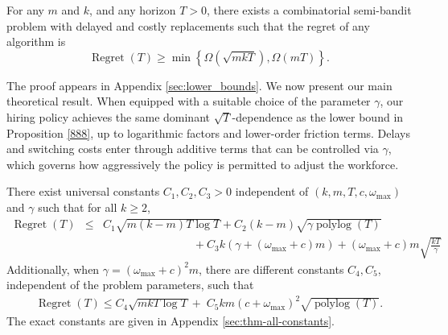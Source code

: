 \documentclass[opre,blindrev]{informs3}
\newcommand{\polylog}{\operatorname{polylog}}
\newcommand{\Regret}{\operatorname{Regret}}
\begin{document}
\begin{proposition} 
\label{888}
For any \(m\) and \(k\), and any horizon \(T > 0\), there exists a combinatorial semi-bandit problem with delayed and costly replacements such that the regret of any algorithm is
\begin{equation*}
    \Regret(T) \geq \min \left\{\Omega\left(\sqrt{mkT}\right), \Omega\left(mT\right) \right\}.
\end{equation*}
\end{proposition}

The proof appears in Appendix \ref{sec:lower_bounds}. We now present our main theoretical result. When equipped with a suitable choice of the parameter \(\gamma\), our hiring policy achieves the same dominant \(\sqrt{T}\)-dependence as the lower bound in Proposition \ref{888}, up to logarithmic factors and lower-order friction terms. Delays and switching costs enter through additive terms that can be controlled via \(\gamma\), which governs how aggressively the policy is permitted to adjust the workforce. 

\begin{theorem}\label{thm:main}
    There exist universal constants \(C_1, C_2, C_3>0\) independent of \((k,m,T,c,\omega_{\max})\) and \(\gamma\) such that for all \(k\ge 2\),
    \begin{eqnarray}
    \label{099}
        \Regret(T) &\le&  C_1 \sqrt{m(k-m)T\log T} 
         + C_2(k-m)\sqrt{\gamma \polylog(T)} \\
        &&\qquad\qquad\qquad\qquad + C_3 k\left(\gamma + (\omega_{\max}+c)m\right)
        + (\omega_{\max}+c)m\sqrt{\frac{kT}{\gamma}}
        \nonumber
    \end{eqnarray}
    Additionally, when \(\gamma = (\omega_{\max}+c)^2m\), there are different constants \(C_4, C_5\), independent of the problem parameters, such that
  \begin{eqnarray}
      \Regret(T) \leq C_4 \sqrt{mkT\log T} 
        +\; C_5km(c+\omega_{\max})^2\sqrt{ \polylog(T)}.
        \label{088}
        \end{eqnarray}
    The exact constants are given in Appendix \ref{sec:thm-all-constants}.
\end{theorem}
\end{document}
